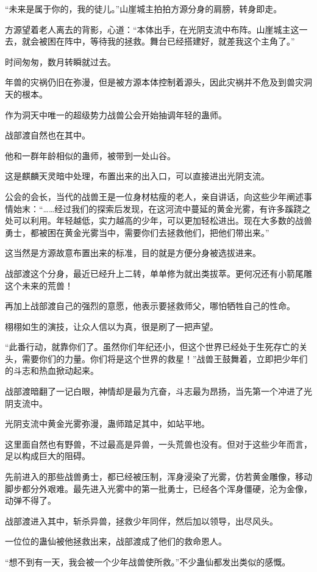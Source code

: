 \begin{this_body}
“未来是属于你的，我的徒儿。”山崖城主拍拍方源分身的肩膀，转身即走。

方源望着老人离去的背影，心道：“本体出手，在光阴支流中布阵。山崖城主这一去，就会被困在阵中，等待我的拯救。舞台已经搭建好，就差我这个主角了。”

时间匆匆，数月转瞬就过去。

年兽的灾祸仍旧在弥漫，但是被方源本体控制着源头，因此灾祸并不危及到兽灾洞天的根本。

作为洞天中唯一的超级势力战兽公会开始抽调年轻的蛊师。

战部渡自然也在其中。

他和一群年龄相似的蛊师，被带到一处山谷。

这是麒麟天灵暗中处理，布置出来的出入口，可以直接进出光阴支流。

公会的会长，当代的战兽王是一位身材枯瘦的老人，亲自讲话，向这些少年阐述事情始末：“……经过我们的探索后发现，在这河流中蔓延的黄金光雾，有许多蹊跷之处可以利用。年轻越低，实力越高的少年，可以更加轻松进出。现在大多数的战兽勇士，都被困在黄金光雾当中，需要你们去拯救他们，把他们带出来。”

这当然是方源故意布置出来的标准，目的就是方便分身被选拔进来。

战部渡这个分身，最近已经升上二转，单单修为就出类拔萃。更何况还有小箭尾雕这个未来的荒兽！

再加上战部渡自己的强烈的意愿，他表示要拯救师父，哪怕牺牲自己的性命。

栩栩如生的演技，让众人信以为真，很是刷了一把声望。

“此番行动，就靠你们了。虽然你们年纪还小，但这个世界已经处于生死存亡的关头，需要你们的力量。你们将是这个世界的救星！”战兽王鼓舞着，立即把少年们的斗志和热血掀动起来。

战部渡暗翻了一记白眼，神情却是最为亢奋，斗志最为昂扬，当先第一个冲进了光阴支流中。

光阴支流中黄金光雾弥漫，蛊师踏足其中，如站平地。

这里面自然也有野兽，不过最高是异兽，一头荒兽也没有。但对于这些少年而言，足以构成巨大的阻碍。

先前进入的那些战兽勇士，都已经被压制，浑身浸染了光雾，仿若黄金雕像，移动脚步都分外艰难。最先进入光雾中的第一批勇士，已经各个浑身僵硬，沦为金像，动弹不得了。

战部渡进入其中，斩杀异兽，拯救少年同伴，然后加以领导，出尽风头。

一位位的蛊仙被他拯救出来，战部渡成了他们的救命恩人。

“想不到有一天，我会被一个少年战兽使所救。”不少蛊仙都发出类似的感慨。


\end{this_body}
